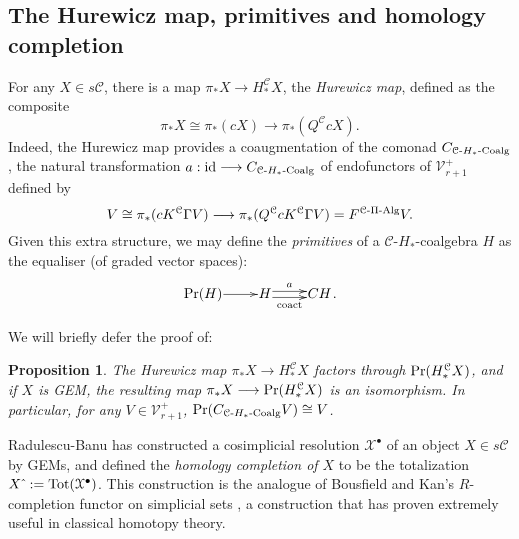 \documentclass[11pt]{amsart}
\theoremstyle{plain}
\newtheorem{prop}[thm]{Proposition}
\theoremstyle{definition}
\renewcommand{\to}{\longrightarrow}
\newcommand{\calX}{\mathcal{X}}
\newcommand{\calC}{\mathcal{C}}
\newcommand{\calV}{\mathcal{V}}
\newcommand{\calc}{\mathcal{C}}
\theoremstyle{plain}
\newcommand{\vect}[2]{\calV^{#1}_{#2}}
\newcommand{\PiAlg}{\textup{-$\Pi$-Alg}}
\newcommand{\HCoalg}{\textup{-$H_*$-Coalg}}
\newcommand{\Id}{\textup{id}}
\begin{document}
\begin{CPiAlgs and CHalgs}
\subsection{The Hurewicz map, primitives and homology completion}\label{The Hurewicz map, primitives and homology completion}
For any $X\in s\calC$, there is a map $\pi_*X\to H_*^{\calC}X$, the \emph{Hurewicz map}, defined as the composite
\[\pi_*X\cong \pi_*(cX)\to \pi_*(Q^{\calC}cX).\]
Indeed, the Hurewicz map provides a coaugmentation of the comonad $C_{\calc\HCoalg}$, the natural transformation $a:\Id\to C_{\calc\HCoalg}$ of endofunctors of $\vect{+}{r+1}$ defined by
\[V\cong \pi_*(cK^{\calC}\Gamma  V)\to \pi_*(Q^{\calC}cK^{\calC}\Gamma  V)=F^{\calC\PiAlg}V.\]
Given this extra structure, we may define the \emph{primitives} of a $\calC$-$H_*$-coalgebra $H$ as the equaliser (of graded vector spaces):
\[\xymatrix@R=4mm@1{
\textup{Pr}(H)\ar[r]
&%
H\ar@<.5ex>[r]^-{a}
\ar@<-.5ex>[r]_-{\textup{coact}}
&%
CH%
}.\]

We will briefly defer the proof of:
\begin{prop}\label{hurewicz}
The Hurewicz map $\pi_*X\to H_*^{\calc}X$ factors through $\textup{Pr}(H_*^{\calC}X)$, and if $X$ is GEM, the resulting map $\pi_*X\to\textup{Pr}(H_*^\calC X)$ is an isomorphism. In particular, for any $V\in\vect{+}{r+1}$, $\textup{Pr}(C_{\calC\HCoalg}V)\cong V$.
\end{prop}

Radulescu-Banu \cite{Radulescu-Banu.pdf} has constructed a cosimplicial resolution $\calX^\bullet$ of an object $X\in s\calc$ by GEMs, and defined the \emph{homology completion of $X$} to be the totalization $X\hat{\ }:=\textup{Tot}(\calX^\bullet)$. This construction is the analogue of Bousfield and Kan's $R$-completion functor on simplicial sets \cite{BousKanSSeq.pdf}, a construction that has proven extremely useful in classical homotopy theory.


\end{CPiAlgs and CHalgs}
\end{document}
